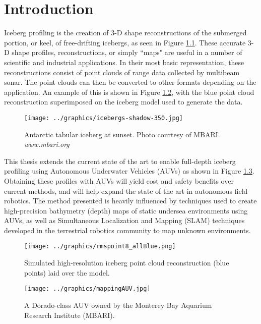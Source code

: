 
\chapter{Introduction}
\label{ch.Introduction}

Iceberg profiling is the creation of 3-D shape reconstructions of the submerged portion, or keel, of free-drifting icebergs, as seen in Figure \ref{fig:IcebergSunset}.  These accurate 3-D shape profiles, reconstructions, or simply ``maps" are useful in a number of scientific and industrial applications.  In their most basic representation, these reconstructions consist of point clouds of range data collected by multibeam sonar. The point clouds can then be converted to other formats depending on the application. An example of this is shown in Figure \ref{fig:idealMap}, with the blue point cloud reconstruction superimposed on the iceberg model used to generate the data.

\begin{figure}[!htb]
   \centering
   \texttt{[image: ../graphics/icebergs-shadow-350.jpg]} %
   \caption{Antarctic tabular iceberg at sunset. Photo courtesy of MBARI. \emph{www.mbari.org}}
   \label{fig:IcebergSunset}
\end{figure}

This thesis extends the current state of the art to enable full-depth iceberg profiling using Autonomous Underwater Vehicles (AUVs) as shown in Figure \ref{fig:AUVdorado1}. Obtaining these profiles with AUVs will yield cost and safety benefits over current methods, and will help expand the state of the art in autonomous field robotics. The method presented is heavily influenced by techniques used to create high-precision bathymetry (depth) maps of static undersea environments using AUVs, as well as Simultaneous Localization and Mapping (SLAM) techniques developed in the terrestrial robotics community to map unknown environments.

\begin{figure}[!htb]
   \centering
   \texttt{[image: ../graphics/rmspoint8\_allBlue.png]} %
   \caption{Simulated high-resolution iceberg point cloud reconstruction (blue points) laid over the model.}
   \label{fig:idealMap}
\end{figure}

\begin{figure}[htb]
   \centering
   \texttt{[image: ../graphics/mappingAUV.jpg]} %
   \caption{A Dorado-class AUV owned by the Monterey Bay Aquarium Research Institute (MBARI).}
   \label{fig:AUVdorado1}
\end{figure}


